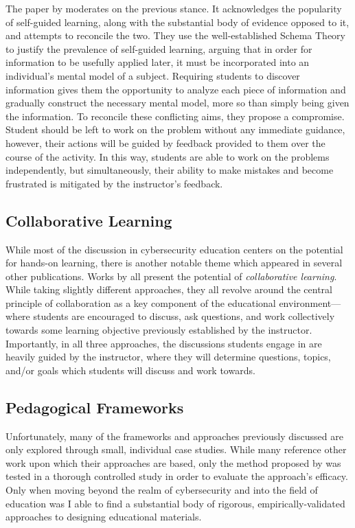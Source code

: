     The paper by \textcite{R-Weiss} moderates on the previous stance. It acknowledges the popularity of self-guided learning, along with the substantial body of evidence opposed to it, and attempts to reconcile the two. They use the well-established Schema Theory to justify the prevalence of self-guided learning, arguing that in order for information to be usefully applied later, it must be incorporated into an individual's mental model of a subject. Requiring students to discover information gives them the opportunity to analyze each piece of information and gradually construct the necessary mental model, more so than simply being given the information. To reconcile these conflicting aims, they propose a compromise. Student should be left to work on the problem without any immediate guidance, however, their actions will be guided by feedback provided to them over the course of the activity. In this way, students are able to work on the problems independently, but simultaneously, their ability to make mistakes and become frustrated is mitigated by the instructor's feedback. 

\subsection{Collaborative Learning}

    While most of the discussion in cybersecurity education centers on the potential for hands-on learning, there is another notable theme which appeared in several other publications. Works by \textcite{P-Deshpande, C-Kussmaul,B-Payne} all present the potential of \emph{collaborative learning}. While taking slightly different approaches, they all revolve around the central principle of collaboration as a key component of the educational environment---where students are encouraged to discuss, ask questions, and work collectively towards some learning objective previously established by the instructor. Importantly, in all three approaches, the discussions students engage in are heavily guided by the instructor, where they will determine questions, topics, and/or goals which students will discuss and work towards. 


\subsection{Pedagogical Frameworks}

    Unfortunately, many of the frameworks and approaches previously discussed are only explored through small, individual case studies. While many reference other work upon which their approaches are based, only the method proposed by \citeauthor{P-Deshpande} was tested in a thorough controlled study in order to evaluate the approach's efficacy. Only when moving beyond the realm of cybersecurity and into the field of education was I able to find a substantial body of rigorous, empirically-validated approaches to designing educational materials. 

